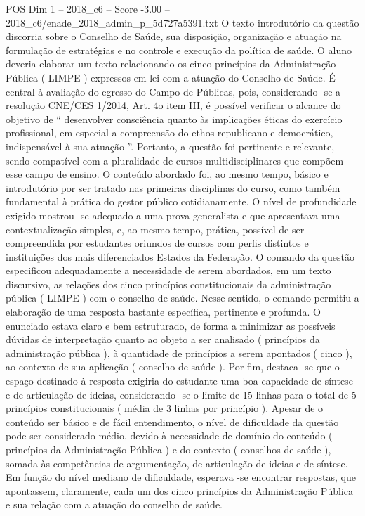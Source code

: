 \begin{textsample}{POS Dim 1 – 2018\_c6 – Score -3.00 – 2018\_c6/enade\_2018\_admin\_p\_5d727a5391.txt}
O texto introdutório da questão discorria sobre o Conselho de Saúde, sua disposição, organização e atuação na formulação de estratégias e no controle e execução da política de saúde.
O aluno deveria elaborar um texto relacionando os cinco princípios da Administração Pública ( LIMPE ) expressos em lei com a atuação do Conselho de Saúde.
É central à avaliação do egresso do Campo de Públicas, pois, considerando -se a resolução CNE/CES 1/2014, Art. 4o item III, é possível verificar o alcance do objetivo de “ desenvolver consciência quanto às implicações éticas do exercício profissional, em especial a compreensão do ethos republicano e democrático, indispensável à sua atuação ”.
Portanto, a questão foi pertinente e relevante, sendo compatível com a pluralidade de cursos multidisciplinares que compõem esse campo de ensino.
O conteúdo abordado foi, ao mesmo tempo, básico e introdutório por ser tratado nas primeiras disciplinas do curso, como também fundamental à prática do gestor público cotidianamente.
O nível de profundidade exigido mostrou -se adequado a uma prova generalista e que apresentava uma contextualização simples, e, ao mesmo tempo, prática, possível de ser compreendida por estudantes oriundos de cursos com perfis distintos e instituições dos mais diferenciados Estados da Federação.
O comando da questão especificou adequadamente a necessidade de serem abordados, em um texto discursivo, as relações dos cinco princípios constitucionais da administração pública ( LIMPE ) com o conselho de saúde.
Nesse sentido, o comando permitiu a elaboração de uma resposta bastante específica, pertinente e profunda.
O enunciado estava claro e bem estruturado, de forma a minimizar as possíveis dúvidas de interpretação quanto ao objeto a ser analisado ( princípios da administração pública ), à quantidade de princípios a serem apontados ( cinco ), ao contexto de sua aplicação ( conselho de saúde ).
Por fim, destaca -se que o espaço destinado à resposta exigiria do estudante uma boa capacidade de síntese e de articulação de ideias, considerando -se o limite de 15 linhas para o total de 5 princípios constitucionais ( média de 3 linhas por princípio ).
Apesar de o conteúdo ser básico e de fácil entendimento, o nível de dificuldade da questão pode ser considerado médio, devido à necessidade de domínio do conteúdo ( princípios da Administração Pública ) e do contexto ( conselhos de saúde ), somada às competências de argumentação, de articulação de ideias e de síntese.
Em função do nível mediano de dificuldade, esperava -se encontrar respostas, que apontassem, claramente, cada um dos cinco princípios da Administração Pública e sua relação com a atuação do conselho de saúde.

\end{textsample}
